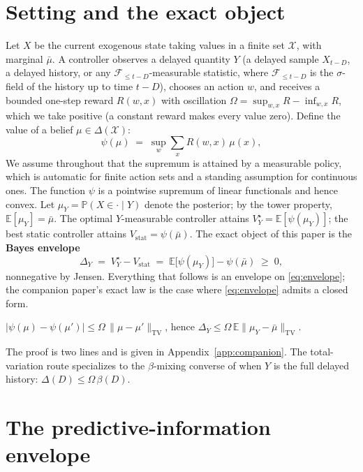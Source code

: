 \documentclass[acmsmall,screen,review,anonymous]{acmart}
\newcommand{\TV}{\mathrm{TV}}
\newcommand{\E}{\mathbb{E}}
\begin{document}
\section{Setting and the exact object}\label{sec:envelope}

Let $X$ be the current exogenous state taking values in a finite set
$\mathcal X$, with marginal $\bar\mu$. A controller observes a delayed
quantity $Y$ (a delayed sample $X_{t-D}$, a delayed history, or any
$\mathcal F_{\le t-D}$-measurable statistic, where $\mathcal F_{\le t-D}$
is the $\sigma$-field of the history up to time $t-D$), chooses an action
$w$, and receives a bounded one-step reward $R(w,x)$ with oscillation
$\Omega=\sup_{w,x}R-\inf_{w,x}R$, which we take positive (a constant
reward makes every value zero). Define the value of a belief
$\mu\in\Delta(\mathcal X)$:
\[
\psi(\mu)\;=\;\sup_{w}\sum_{x}R(w,x)\,\mu(x),
\]
We assume throughout that the supremum is attained by a measurable
policy, which is automatic for finite action sets and a standing
assumption for continuous ones. The function $\psi$ is a pointwise
supremum of linear functionals and hence convex. Let
$\mu_Y=\mathbb P(X\in\cdot\mid Y)$ denote the posterior; by the tower
property, $\E[\mu_Y]=\bar\mu$. The optimal $Y$-measurable controller attains
$V^\star_Y=\E[\psi(\mu_Y)]$; the best static controller attains
$V_{\mathrm{stat}}=\psi(\bar\mu)$. The exact object of this paper is the
\textbf{Bayes envelope}
\begin{equation}\label{eq:envelope}
\Delta_Y \;=\; V^\star_Y - V_{\mathrm{stat}}
\;=\; \E\bigl[\psi(\mu_Y)\bigr]-\psi(\bar\mu)\;\ge\;0,
\end{equation}
nonnegative by Jensen. Everything that follows is an envelope on
\eqref{eq:envelope}; the companion paper's exact law is the case where
\eqref{eq:envelope} admits a closed form.

\begin{lemma}\label{lem:lip}
$|\psi(\mu)-\psi(\mu')|\le\Omega\,\|\mu-\mu'\|_{\TV}$, hence
$\Delta_Y\le\Omega\,\E\|\mu_Y-\bar\mu\|_{\TV}$.
\end{lemma}

The proof is two lines and is given in Appendix~\ref{app:companion}.
The total-variation route specializes to the $\beta$-mixing converse of
\cite{infocom} when $Y$ is the full delayed history:
$\Delta(D)\le\Omega\,\beta(D)$.

\section{The predictive-information envelope}\label{sec:mi}
\end{document}
